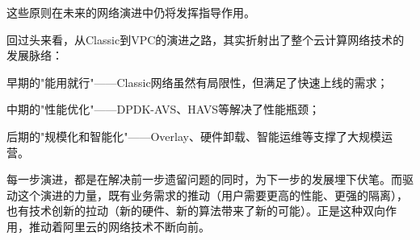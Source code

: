这些原则在未来的网络演进中仍将发挥指导作用。

回过头来看，从Classic到VPC的演进之路，其实折射出了整个云计算网络技术的发展脉络：

早期的"能用就行"——Classic网络虽然有局限性，但满足了快速上线的需求；

中期的"性能优化"——DPDK-AVS、HAVS等解决了性能瓶颈；

后期的"规模化和智能化"——Overlay、硬件卸载、智能运维等支撑了大规模运营。

每一步演进，都是在解决前一步遗留问题的同时，为下一步的发展埋下伏笔。而驱动这个演进的力量，既有业务需求的推动（用户需要更高的性能、更强的隔离），也有技术创新的拉动（新的硬件、新的算法带来了新的可能）。正是这种双向作用，推动着阿里云的网络技术不断向前。


